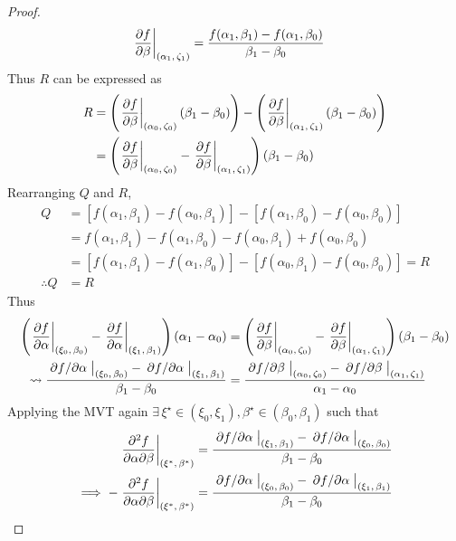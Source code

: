 \begin{theorem}
\begin{proof}
\begin{align*}
			\eval{\pdv{f}{\beta}}_{\point{\alpha_1}{\zeta_1}}&=\frac{f(\alpha_1,\beta_1)-f(\alpha_1,\beta_0)}{\beta_1-\beta_0}
		\end{align*}
		Thus $R$ can be expressed as
		\begin{align*}
			R&=\left(\eval{\pdv{f}{\beta}}_{\point{\alpha_0}{\zeta_0}}\left(\beta_1-\beta_0\right)\right)-\left(\eval{\pdv{f}{\beta}}_{\point{\alpha_1}{\zeta_1}}\left(\beta_1-\beta_0\right)\right)\\
			&=\left(\eval{\pdv{f}{\beta}}_{\point{\alpha_0}{\zeta_0}}-\eval{\pdv{f}{\beta}}_{\point{\alpha_1}{\zeta_1}}\right)\left(\beta_1-\beta_0\right)
		\end{align*}
		Rearranging $Q$ and $R$,
		\begin{align*}
			Q&=[f(\alpha_1,\beta_1)-f(\alpha_0,\beta_1)]-[f(\alpha_1,\beta_0)-f(\alpha_0,\beta_0)]\\
			&=f(\alpha_1,\beta_1)-f(\alpha_1,\beta_0)-f(\alpha_0,\beta_1)+f(\alpha_0,\beta_0)\\
			&=[f(\alpha_1,\beta_1)-f(\alpha_1,\beta_0)]-[f(\alpha_0,\beta_1)-f(\alpha_0,\beta_0)]=R\\
			\therefore Q&=R
		\end{align*}
		Thus
		\begin{align}
			\notag\left(\eval{\pdv{f}{\alpha}}_{\point{\xi_0}{\beta_0}}-\eval{\pdv{f}{\alpha}}_{\point{\xi_1}{\beta_1}}\right)\left(\alpha_1-\alpha_0\right)&=\left(\eval{\pdv{f}{\beta}}_{\point{\alpha_0}{\zeta_0}}-\eval{\pdv{f}{\beta}}_{\point{\alpha_1}{\zeta_1}}\right)\left(\beta_1-\beta_0\right)\\
			\label{proof:SYMMETRY}\leadsto\frac{\eval{\pdv*{f}{\alpha}}_{\point{\xi_0}{\beta_0}}-\eval{\pdv*{f}{\alpha}}_{\point{\xi_1}{\beta_1}}}{\beta_1-\beta_0}&=\frac{\eval{\pdv*{f}{\beta}}_{\point{\alpha_0}{\zeta_0}}-\eval{\pdv*{f}{\beta}}_{\point{\alpha_1}{\zeta_1}}}{\alpha_1-\alpha_0}
		\end{align}
		Applying the MVT again $\exists\,\xi^\star\in(\xi_0,\xi_1),\beta^\star\in(\beta_0,\beta_1)$ such that
		\begin{align*}
			\eval{\pdv{f}{\alpha}{\beta}}_{\point{\xi^\star}{\beta^\star}}&=\frac{\eval{\pdv*{f}{\alpha}}_{\point{\xi_1}{\beta_1}}-\eval{\pdv*{f}{\alpha}}_{\point{\xi_0}{\beta_0}}}{\beta_1-\beta_0}\\
			\implies-\eval{\pdv{f}{\alpha}{\beta}}_{\point{\xi^\star}{\beta^\star}}&=\frac{\eval{\pdv*{f}{\alpha}}_{\point{\xi_0}{\beta_0}}-\eval{\pdv*{f}{\alpha}}_{\point{\xi_1}{\beta_1}}}{\beta_1-\beta_0}
		\end{align*}

\end{proof}
\end{theorem}
